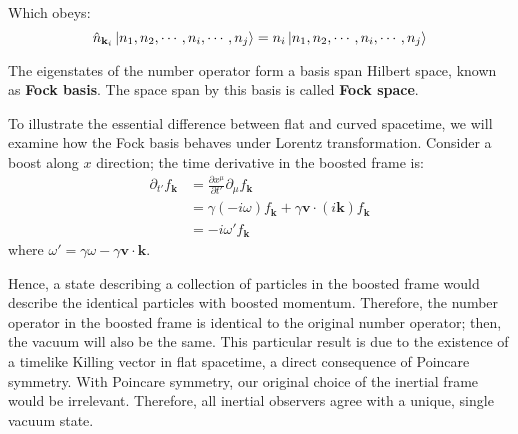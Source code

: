\documentclass[12pt]{article}
\numberwithin{equation}{section}
\theoremstyle{1style}
\newcommand{\tbf}[1]{\textbf{#1}}
\newcommand{\p}{\partial}
\begin{document}
Which obeys:
\begin{equation}
  \hat{n}_{\mathbf{k}_i}\ket{n_1,n_2,\cdots,n_i,\cdots,n_j}=    n_i\ket{n_1,n_2,\cdots,n_i,\cdots,n_j}
\end{equation}

The eigenstates of the number operator form a basis span Hilbert space, known as \tbf{Fock basis}.
The space span by this basis is called \tbf{Fock space}.

To illustrate the essential difference between flat and curved spacetime, we will examine how the Fock basis behaves under Lorentz transformation.
Consider a boost along \(x\) direction; the time derivative in the boosted frame is:
\begin{align}\label{pg}
  \p_{t'}f_{\mathbf{k}} & =\frac{\p x^{\mu}}{\p t'}\p_{\mu}f_{\mathbf{k}}                                   \\
                        & =\gamma(-i\omega)f_{\mathbf{k}}+\gamma\mathbf{v}\cdot (i\mathbf{k})f_{\mathbf{k}} \\
                        & =-i\omega'f_{\mathbf{k}}
\end{align}
where \(\omega'=\gamma\omega-\gamma\mathbf{v}\cdot \mathbf{k}.\)

Hence, a state describing a collection of particles in the boosted frame would describe the identical particles with boosted momentum.
Therefore, the number operator in the boosted frame is identical to the original number operator; then, the vacuum will also be the same.
This particular result is due to the existence of a timelike Killing vector in flat spacetime, a direct consequence of Poincare symmetry.
With Poincare symmetry, our original choice of the inertial frame would be irrelevant.
Therefore, all inertial observers agree with a unique, single vacuum state.
\end{document}
